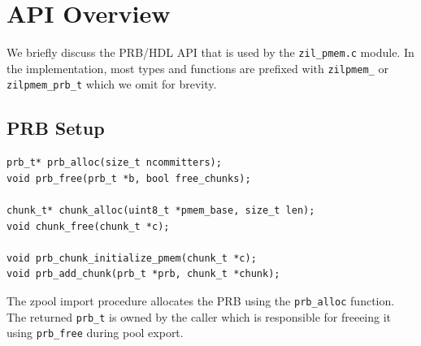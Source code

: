 \documentclass[12pt,a4paper,twoside]{book}
\begin{document}


\section{API Overview}\label{di:prb:api}
We briefly discuss the PRB/HDL API that is used by the \texttt{zil\_pmem.c} module.
In the implementation, most types and functions are prefixed with \lstinline{zilpmem_} or \lstinline{zilpmem_prb_t} which we omit for brevity.

\subsection{PRB Setup}
\begin{lstlisting}
prb_t* prb_alloc(size_t ncommitters);
void prb_free(prb_t *b, bool free_chunks);

chunk_t* chunk_alloc(uint8_t *pmem_base, size_t len);
void chunk_free(chunk_t *c);

void prb_chunk_initialize_pmem(chunk_t *c);
void prb_add_chunk(prb_t *prb, chunk_t *chunk);
\end{lstlisting}

The zpool import procedure allocates the PRB using the \lstinline{prb_alloc} function.
The returned \lstinline{prb_t} is owned by the caller which is responsible for freeeing it using \lstinline{prb_free} during pool export.
\end{document}

